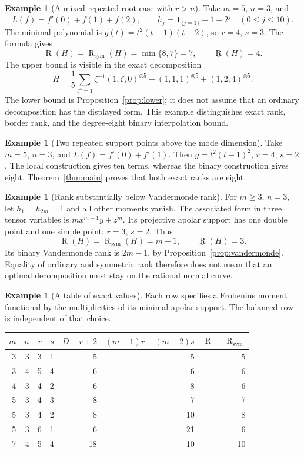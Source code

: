 \documentclass[11pt]{article}
\theoremstyle{definition}
\newtheorem{example}[theorem]{Example}
\theoremstyle{remark}
\newcommand{\Rk}{\operatorname{R}}
\newcommand{\SR}{\operatorname{R}_{\mathrm{sym}}}
\newcommand{\BR}{\underline{\operatorname{R}}}
\begin{document}
\begin{example}[A mixed repeated-root case with $r>n$]\label{ex:mixed}
Take $m=5$, $n=3$, and
\[
 L(f)=f'(0)+f(1)+f(2),\qquad
 h_j=\mathbf1_{\{j=1\}}+1+2^j\quad(0\le j\le10).
\]
The minimal polynomial is $g(t)=t^2(t-1)(t-2)$, so $r=4$, $s=3$.
The formula gives
\[
 \Rk(H)=\SR(H)=\min\{8,7\}=7,
 \qquad \BR(H)=4.
\]
The upper bound is visible in the exact decomposition
\[
 H=\frac15\sum_{\zeta^5=1}\zeta^{-1}(1,\zeta,0)^{\otimes5}
       +(1,1,1)^{\otimes5}+(1,2,4)^{\otimes5}.
\]
The lower bound is Proposition~\ref{prop:lower}; it does not assume that an
ordinary decomposition has the displayed form. This example distinguishes
exact rank, border rank, and the degree-eight binary interpolation bound.
\end{example}

\begin{example}[Two repeated support points above the mode dimension]
Take $m=5$, $n=3$, and $L(f)=f'(0)+f'(1)$.
Then $g=t^2(t-1)^2$, $r=4$, $s=2$. The local construction gives ten terms,
whereas the binary construction gives eight. Theorem~\ref{thm:main} proves
that both exact ranks are eight.
\end{example}

\begin{example}[Rank substantially below Vandermonde rank]
For $m\ge3$, $n=3$, let $h_1=h_{2m}=1$ and all other moments vanish.
The associated form in three tensor variables is
$m x^{m-1}y+z^m$.
Its projective apolar support has one double point and one simple point:
$r=3$, $s=2$. Thus
\[
 \Rk(H)=\SR(H)=m+1,
 \qquad \BR(H)=3.
\]
Its binary Vandermonde rank is $2m-1$, by Proposition~\ref{prop:vandermonde}. Equality of ordinary and symmetric rank therefore does not mean
that an optimal decomposition must stay on the rational normal curve.
\end{example}

\begin{example}[A table of exact values]
Each row specifies a Frobenius moment functional by the multiplicities of its
minimal apolar support. The balanced row is independent of that choice.
\begin{center}
\begin{tabular}{@{}rrrrrrr@{}}
\toprule
$m$&$n$&$r$&$s$&$D-r+2$&$(m-1)r-(m-2)s$&$\Rk=\SR$\\
\midrule
3&3&3&1&5&5&5\\
3&4&5&4&6&6&6\\
4&3&4&2&6&8&6\\
5&3&4&3&8&7&7\\
5&3&4&2&8&10&8\\
5&3&6&1&6&21&6\\
7&4&5&4&18&10&10\\
\bottomrule
\end{tabular}
\end{center}
\end{example}
\end{document}
